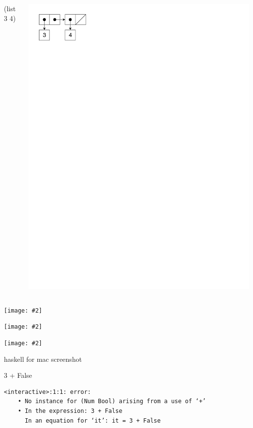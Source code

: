 \documentclass[UKenglish,usenames,dvipsnames,svgnames,table,aspectratio=169,mathserif]{beamer}
\newcommand{\nl}{\vspace{\baselineskip}}
\newcommand{\imageslide}[2][1]{{
\begin{frame}\begin{center}
\texttt{[image: \#2]}
\end{center}\end{frame}
}}
\begin{document}
\begin{frame}[fragile]
\begin{columns}[T]
\begin{schemecode}
  (list 3 4)
\end{schemecode}
\includegraphics{list-cons2.pdf}
\end{columns}
\end{frame}


\imageslide[0.7]{list-cons-racket.png}
\fi


\imageslide[1.3]{pushout1.pdf}
\imageslide[1.3]{pushout2.pdf}

\begin{frame}

haskell for mac screenshot
\end{frame}


\begin{frame}[fragile]

\Large
\begin{texttt}
3 + False
\end{texttt}
\nl

\large
\begin{block}{}
\begin{Verbatim}
<interactive>:1:1: error:
    • No instance for (Num Bool) arising from a use of ‘+’
    • In the expression: 3 + False
      In an equation for ‘it’: it = 3 + False
\end{Verbatim}
\end{block}
\end{frame}
\end{document}
